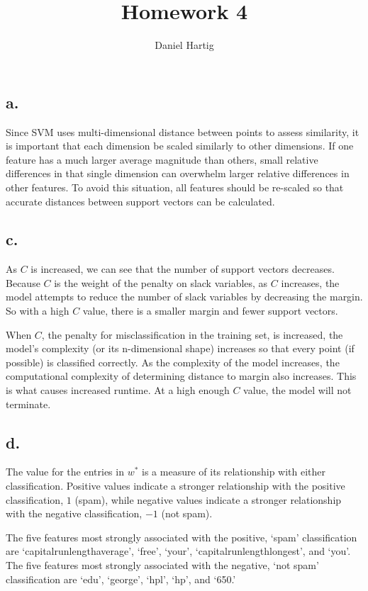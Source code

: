 \documentclass{article}
\title{Homework 4}
\author{Daniel Hartig}
\begin{document}
\maketitle

\subsection*{a.}
Since SVM uses multi-dimensional distance between points to assess similarity, it is important that each dimension be scaled similarly to other dimensions. If one feature has a much larger average magnitude than others, small relative differences in that single dimension can overwhelm larger relative differences in other features. To avoid this situation, all features should be re-scaled so that accurate distances between support vectors can be calculated.

\subsection*{c.}

As $C$ is increased, we can see that the number of support vectors decreases. Because $C$ is the weight of the penalty on slack variables, as $C$ increases, the model attempts to reduce the number of slack variables by decreasing the margin. So with a high $C$ value, there is a smaller margin and fewer support vectors.

When $C$, the penalty for misclassification in the training set, is increased, the model's complexity (or its n-dimensional shape) increases so that every point (if possible) is classified correctly. As the complexity of the model increases, the computational complexity of determining distance to margin also increases. This is what causes increased runtime. At a high enough $C$ value, the model will not terminate. 

\subsection*{d.}
The value for the entries in $w^*$ is a measure of its relationship with either classification. Positive values indicate a stronger relationship with the positive classification, $1$ (spam), while negative values indicate a stronger relationship with the negative classification, $-1$ (not spam).

The five features most strongly associated with the positive, `spam' classification are `capital\textunderscore run\textunderscore length\textunderscore average', `free', `your', `capital\textunderscore run\textunderscore length\textunderscore longest', and `you'. The five features most strongly associated with the negative, `not spam' classification are `edu', `george', `hpl', `hp', and `650.'
\end{document}
